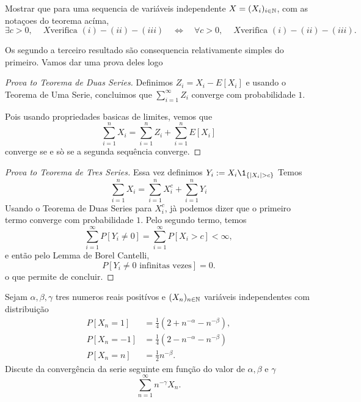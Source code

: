 \begin{topics}
\begin{exercise}
Mostrar que para uma sequencia de variáveis independente $X=(X_i)_{i\in {\ensuremath{\mathbb N}}}$, com as notaçoes do teorema acíma,
$$ \exists c>0,\ \quad X \text{verifica $(i)-(ii)-(iii)$}  \quad \Leftrightarrow \quad \forall c>0,\ \quad X \text{verifica $(i)-(ii)-(iii)$}.$$
 
\end{exercise}


Os segundo a terceiro resultado são consequencia relativamente simples do primeiro.
Vamos dar uma prova deles logo
\begin{proof}[Prova to Teorema de Duas Series]
 Definimos $Z_i=X_i-E[X_i]$ e usando o Teorema de Uma Serie, concluimos que $\sum_{i=1}^{\infty} Z_i$ converge com probabilidade $1$. 
 
 \medskip
 
 Pois usando propriedades basicas de limites, vemos que $$\sum_{i=1}^n X_i=\sum_{i=1}^n Z_i+ \sum_{i=1}^n E[X_i]$$ converge se e sò se 
 a segunda sequência converge.
 \end{proof}

 \begin{proof}[Prova to Teorema de Tres Series]
Essa vez definimos $Y_i:= X_i \1_{\{|X_i| > c\}}$
Temos 
\begin{equation}
 \sum_{i=1}^n X_i =  \sum_{i=1}^n X_i^c + \sum_{i=1}^n Y_i
\end{equation}
Usando o Teorema de Duas Series para $X_i^c$, jà podemos dizer que o primeiro termo converge com probabilidade $1$.
Pelo segundo termo, temos 
\begin{equation}
 \sum_{i=1}^{\infty} P[Y_i\ne 0]=   \sum_{i=1}^{\infty} P[ X_i>c ]< \infty, 
\end{equation}
e então pelo Lemma de Borel Cantelli, $$P[ Y_i \ne 0 \text{ infinitas vezes}]=0.$$ 
 o que permite de concluir.
\end{proof}


\begin{exercise}
Sejam $\alpha, \beta, \gamma$ tres numeros reais positívos e $(X_n)_{n\in {\ensuremath{\mathbb N}}}$ variáveis independentes com distribuição
 \begin{equation} \begin{split}
 P[X_n=1]&=\frac{1}{4}\left(2+n^{-\alpha}-n^{-\beta}\right), \\ 
 P[X_n=-1]&=\frac{1}{4}\left(2-n^{-\alpha}-n^{-\beta}\right) \\
 P[X_n= n]&= \frac{1}{2} n^{-\beta}.
 \end{split}
\end{equation}
Discute da convergência da serie seguinte em função do valor de $\alpha, \beta$ e $\gamma$
\begin{equation}
 \sum_{n=1}^{\infty} n^{-\gamma} X_n.
\end{equation}



\end{exercise}
\end{topics}
